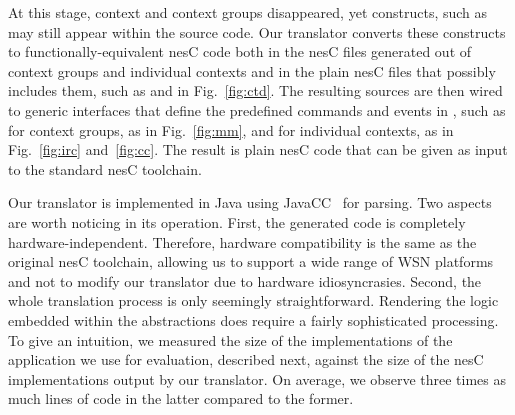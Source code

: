 At this stage, context and context groups disappeared, yet \conesc
constructs, such as  may still appear within the source
code. Our translator converts these constructs to
functionally-equivalent nesC code both in the nesC files generated out
of context groups and individual contexts and in the plain nesC files
that possibly includes them, such as  and  in
Fig.~\ref{fig:ctd}. The resulting sources are then wired to generic
interfaces that define the predefined commands and events in \conesc,
such as  for context groups, as in
Fig.~\ref{fig:mm}, and  for individual
contexts, as in Fig.~\ref{fig:irc} and~\ref{fig:cc}. The result is
plain nesC code that can be given as input to the standard nesC
toolchain.




Our translator is implemented in Java using JavaCC~\cite{} for
parsing. Two aspects are worth noticing in its operation. First, the
generated code is completely hardware-independent. Therefore, hardware
compatibility is the same as the original nesC toolchain, allowing us
to support a wide range of WSN platforms and not to modify our
translator due to hardware idiosyncrasies. Second, the whole
translation process is only seemingly straightforward. Rendering the
logic embedded within the \conesc abstractions does require a fairly
sophisticated processing. To give an intuition, we measured the size
of the \conesc implementations of the application we use for
evaluation, described next, against the size of the nesC
implementations output by our translator. On average, we observe three
times as much lines of code in the latter compared to the former.


